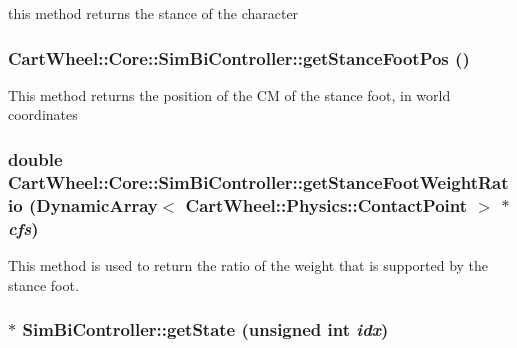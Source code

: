 this method returns the stance of the character \hypertarget{classCartWheel_1_1Core_1_1SimBiController_a4d47e5b30f5e40e90ae9ef3d93dc03c9}{
\subsubsection[{getStanceFootPos}]{ CartWheel::Core::SimBiController::getStanceFootPos ()}}
\label{classCartWheel_1_1Core_1_1SimBiController_a4d47e5b30f5e40e90ae9ef3d93dc03c9}
This method returns the position of the CM of the stance foot, in world coordinates \hypertarget{classCartWheel_1_1Core_1_1SimBiController_ab2d20ea4062b83c047d93ffc99ad2b34}{
\subsubsection[{getStanceFootWeightRatio}]{\setlength{\rightskip}{0pt plus 5cm}double CartWheel::Core::SimBiController::getStanceFootWeightRatio (DynamicArray$<$ {\bf CartWheel::Physics::ContactPoint} $>$ $\ast$ {\em cfs})}}
\label{classCartWheel_1_1Core_1_1SimBiController_ab2d20ea4062b83c047d93ffc99ad2b34}
This method is used to return the ratio of the weight that is supported by the stance foot. \hypertarget{classCartWheel_1_1Core_1_1SimBiController_a7fe3c8e738ae4c673abeae686bfd040f}{
\subsubsection[{getState}]{ $\ast$ SimBiController::getState (unsigned int {\em idx})}}
\label{classCartWheel_1_1Core_1_1SimBiController_a7fe3c8e738ae4c673abeae686bfd040f}
